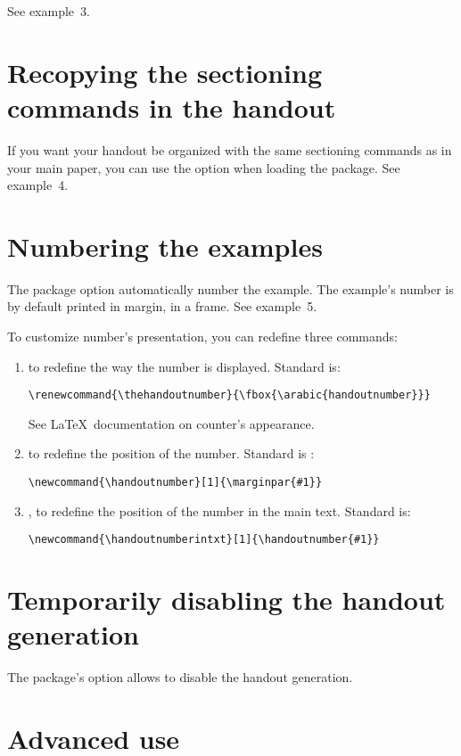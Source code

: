 \documentclass{ltxdockit}[2011/03/25]
\begin{document}
See example~3.

\section{Recopying the sectioning commands in the handout}

If you want your handout be organized with the same sectioning commands as in your main paper, you can use the option  when loading the package. See example~4.

\section{Numbering the examples}

The package option  automatically number the example. The example's number is by default printed in margin, in a frame. See example~5. 

To customize number's presentation, you can redefine three commands:
\begin{enumerate}  
  \item {} to redefine the way the number is displayed. Standard is:
\begin{verbatim}
\renewcommand{\thehandoutnumber}{\fbox{\arabic{handoutnumber}}}
\end{verbatim}  
See \LaTeX\ documentation on counter's appearance. 
  \item {} to redefine the position of the number. Standard is :
\begin{verbatim}
\newcommand{\handoutnumber}[1]{\marginpar{#1}}
\end{verbatim}
  \item {}, to redefine the position of the number in the main text. Standard is:
\begin{verbatim}
\newcommand{\handoutnumberintxt}[1]{\handoutnumber{#1}}
\end{verbatim}
\end{enumerate}

\section{Temporarily disabling the handout generation}

The package's option  allows to disable the handout generation. 

\section{Advanced use}
\end{document}

